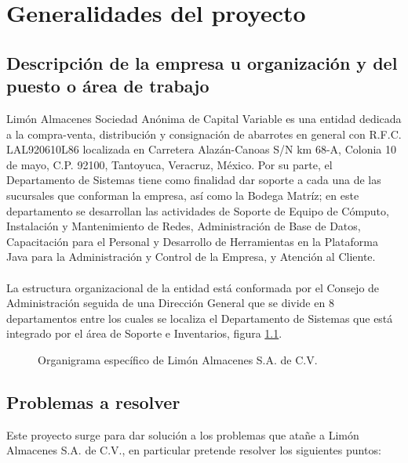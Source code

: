 \chapter{Generalidades del proyecto}

\section{Descripción de la empresa u organización y del puesto o área de trabajo}
Limón Almacenes Sociedad Anónima de Capital Variable es una entidad dedicada a la compra-venta, distribución y consignación de abarrotes en general con R.F.C. LAL920610L86 localizada en Carretera Alazán-Canoas S/N km 68-A, Colonia 10 de mayo, C.P. 92100, Tantoyuca, Veracruz, México. Por su parte, el Departamento de Sistemas tiene como finalidad dar soporte a cada una de las sucursales que conforman la empresa, así como la Bodega Matríz; en este departamento se desarrollan las actividades de Soporte de Equipo de Cómputo, Instalación y Mantenimiento de Redes, Administración de Base de Datos, Capacitación para el Personal y Desarrollo de Herramientas en la Plataforma Java para la Administración y Control de la Empresa, y Atención al Cliente.
\\
\\ La estructura organizacional de la entidad está conformada por el Consejo de Administración seguida de una Dirección General que se divide en 8 departamentos entre los cuales se localiza el Departamento de Sistemas que está integrado por el área de Soporte e Inventarios, figura \ref{organigrama}.

\begin{figure}[!h]
	\centering
	\caption{Organigrama específico de Limón Almacenes S.A. de C.V.}
	\label{organigrama}
\end{figure}

\section{Problemas a resolver}
Este proyecto surge para dar solución a los problemas que atañe a Limón Almacenes S.A. de C.V., en particular pretende resolver los siguientes puntos:

